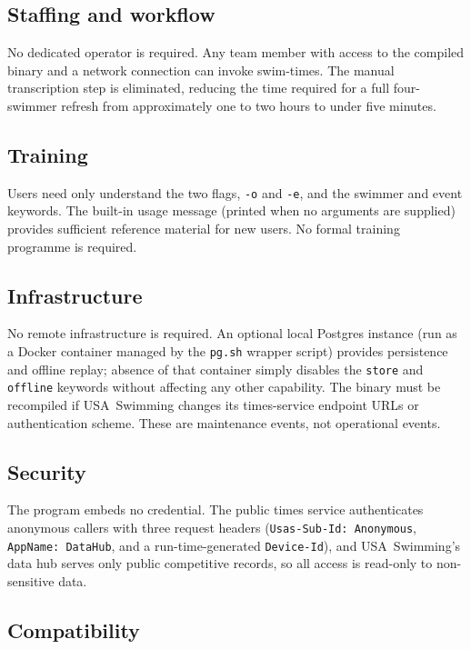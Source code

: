 \documentclass[12pt]{article}
\newcommand{\code}[1]{\texttt{#1}}
\begin{document}
\subsection{Staffing and workflow}

No dedicated operator is required.  Any team member with access
to the compiled binary and a network connection can invoke
swim-times.  The manual transcription step is eliminated,
reducing the time required for a full four-swimmer refresh from
approximately one to two hours to under five minutes.

\subsection{Training}

Users need only understand the two flags, \code{-o} and \code{-e},
and the swimmer and event keywords.  The built-in usage message
(printed when no arguments are supplied) provides sufficient
reference material for new users.  No formal training programme
is required.

\subsection{Infrastructure}

No remote infrastructure is required.  An optional local Postgres
instance (run as a Docker container managed by the
\texttt{pg.sh} wrapper script) provides persistence and offline
replay; absence of that container simply disables the
\code{store} and \code{offline} keywords without affecting any
other capability.  The binary must be recompiled if USA~Swimming
changes its times-service endpoint URLs or authentication scheme.
These are maintenance events, not operational events.

\subsection{Security}

The program embeds no credential.  The public times service
authenticates anonymous callers with three request headers
(\code{Usas-Sub-Id: Anonymous}, \code{AppName: DataHub}, and a
run-time-generated \code{Device-Id}), and USA~Swimming's data hub
serves only public competitive records, so all access is
read-only to non-sensitive data.

\subsection{Compatibility}
\end{document}
